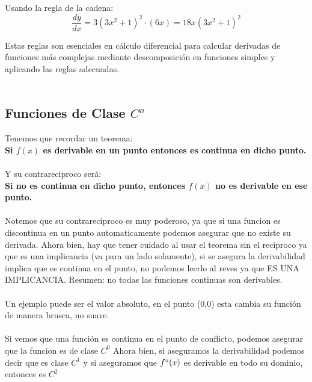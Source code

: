 \documentclass[12pt]{article}
\begin{document}
{Usando la regla de la cadena:
\[ \frac{dy}{dx} = 3(3x^2 + 1)^2 \cdot (6x) = 18x(3x^2 + 1)^2 \]

Estas reglas son esenciales en cálculo diferencial para calcular derivadas de funciones más complejas mediante descomposición en funciones simples y aplicando las reglas adecuadas.\\\\
    
    \subsection{ Funciones de Clase $C^n$} 
   Tenemos que recordar un teorema:\\
    \quad \textbf{Si $f(x)$ es derivable en un punto entonces es continua en dicho punto.} \\\\
    Y su contrareciproco será: \\
    \quad \textbf{Si no es continua en dicho punto, entonces $f(x)$ no es derivable en ese punto.} \\\\
   Notemos que su contrareciproco es muy poderoso, ya que si una funcion es discontinua en un punto automaticamente podemos asegurar que no existe su derivada. Ahora bien, hay que tener cuidado al usar el teorema sin el reciproco ya que es una implicancia (va para un lado solamente), si se asegura la derivabilidad implica que es continua en el punto, no podemos leerlo al reves ya que ES UNA IMPLICANCIA. Resumen: no todas las funciones continuas son derivables. \\\\
    Un ejemplo puede ser el valor absoluto, en el punto (0,0) esta cambia su función de manera brusca, no suave. \\\\
    Si vemos que una función es continua en el punto de conflicto, podemos asegurar que la funcion es de clase $C^0$ Ahora bien, si aseguramos la derivabilidad podemos decir que es clase $C^1$ y si aseguramos que $f``(x)$ es derivable  en todo su dominio, entonces es $C^2$\\
\vspace{1em}

}
\end{document}
